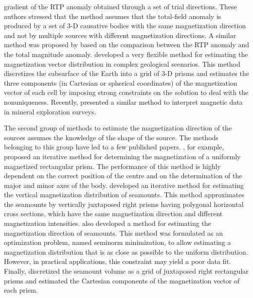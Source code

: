 \documentclass[journal abbreviation, npg]{copernicus}
\begin{document}
gradient of the RTP anomaly obtained through a set of trial directions. These
authors stressed that the method assumes that the total-field anomaly is
produced by a set of 3-D causative bodies with the same magnetization
direction and not by multiple sources with different magnetization
directions. A similar method was proposed by \citet{gerovska-etal2009} based
on the comparison between the RTP anomaly and the total magnitude anomaly.
\citet{lelievre-oldenburg2009} developed a very flexible method for
estimating the magnetization vector distribution in complex geological
scenarios. This method discretizes the subsurface of the Earth into a grid of
3-D prisms and estimates the three components (in Cartesian or spherical
coordinates) of the magnetization vector of each cell by imposing strong
constraints on the solution to deal with the nonuniqueness. Recently,
\citet{ellis-etal2012} presented a similar method to interpret magnetic data
in mineral exploration surveys.

The second group of methods to estimate the magnetization direction of
the sources assumes the knowledge of the shape of the source. The
methods belonging to this group have led to a few published
papers. \citet{bhattacharyya1966}, for example, proposed an iterative
method for determining the magnetization of a uniformly magnetized
rectangular prism. The performance of this method is highly dependent
on the correct position of the centre and on the determination of the
major and minor axes of the body. \citet{emilia-massey1974} developed
an iterative method for estimating the vertical magnetization
distribution of seamounts. This method approximates the seamounts by
vertically juxtaposed right prisms having polygonal horizontal cross
sections, which have the same magnetization direction and different
magnetization intensities. \citet{parker-etal1987} also developed
a method for estimating the magnetization direction of seamounts. This
method was formulated as an optimization problem, named seminorm
minimization, to allow estimating a magnetization distribution that is
as close as possible to the uniform distribution. However, in
practical applications, this constraint may yield a poor data
fit. Finally, \citet{kubota-uchiyama2005} discretized the seamount
volume as a grid of juxtaposed right rectangular prisms and estimated
the Cartesian components of the magnetization vector of each prism.
\end{document}
